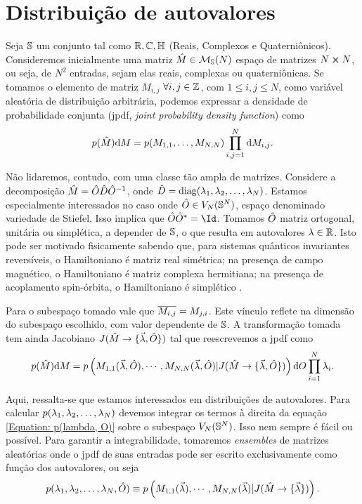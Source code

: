 \section{Distribuição de autovalores}

Seja $\mathbb{S}$ um conjunto tal como $\mathbb{R}, \mathbb{C}, \mathbb{H} $ (Reais, Complexos e Quaterniônicos). Consideremos inicialmente uma matriz $\hat M \in \mathcal{M}_{\mathbb{S}}(N)$ espaço de matrizes $N \cross N$, ou seja, de $N^2$ entradas, sejam elas reais, complexas ou quaterniônicas. Se tomamos o elemento de matriz $M_{i,j}$ $\forall i, j \in \mathbb{Z}$, com $1 \leq i, j \leq N$, como variável aleatória de distribuição arbitrária, podemos expressar a densidade de probabilidade conjunta (jpdf, \textit{joint probability density function}) como $$p(\hat{M}) \dd M = p(M_{1,1}, \dots, M_{N,N}) \prod_{i,j=1}^{N} \dd M_{i,j}.$$

Não lidaremos, contudo, com uma classe tão ampla de matrizes. Considere a decomposição $\hat M = \hat O \hat D \hat O^{-1}$, onde $\hat D = \operatorname{diag}(\lambda_1, \lambda_2, \dots, \lambda_N)$. Estamos especialmente interessados no caso onde $\hat O \in V_N(\mathbb{S}^N)$, espaço denominado variedade de Stiefel. Isso implica que $ \matriz{O} \matriz{O}^* = \Id$. Tomamos $\hat O$ matriz ortogonal, unitária ou simplética, a depender de $\mathbb{S}$, o que resulta em autovalores $\lambda \in \mathbb{R}$. Isto pode ser motivado fisicamente sabendo que, para sistemas quânticos invariantes reversíveis, o Hamiltoniano é matriz real simétrica; na presença de campo magnético, o Hamiltoniano é matriz complexa hermitiana; na presença de acoplamento spin-órbita, o Hamiltoniano é simplético \cite[Capítulo~2]{RMT-firstcourse-Potters}.

Para o subespaço tomado vale que $\overline{M_{i,j}} = M_{j, i}$. Este vínculo reflete na dimensão do subespaço escolhido, com valor dependente de $\mathbb{S}$. A transformação tomada tem ainda Jacobiano $J(\hat M \rightarrow \{ \vec{\lambda}, \hat O \} )$ tal que reescrevemos a jpdf como 
\begin{equation}
	 p(\hat{M}) \dd M = p \left( M_{1,1}(\vec{\lambda}, \hat O), \cdots, M_{N,N}(\vec{\lambda}, \hat O) | J(\hat M \rightarrow \{ \vec{\lambda}, \hat O \} ) \right) \dd O \prod_{i=1}^{N} \lambda_i.
\label{Equation: p(lambda, O)}
\end{equation}

Aqui, ressalta-se que estamos interessados em distribuições de autovalores. Para calcular $p(\lambda_1, \lambda_2, \dots, \lambda_N)$ devemos integrar os termos à direita da equação \ref{Equation: p(lambda, O)} sobre o subespaço $V_N(\mathbb{S}^N)$. Isso nem sempre é fácil ou possível. Para garantir a integrabilidade, tomaremos \textit{ensembles} de matrizes aleatórias onde o jpdf de suas entradas pode ser escrito exclusivamente como função dos autovalores, ou seja $$p(\lambda_1, \lambda_2, \dots, \lambda_N, \hat O) \equiv p \left( M_{1,1}(\vec{\lambda}), \cdots, M_{N,N}(\vec{\lambda}) | J(\hat M \rightarrow \{ \vec{\lambda} \} ) \right).$$

